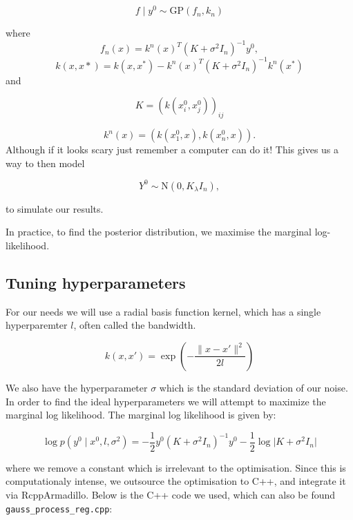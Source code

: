 \documentclass[
]{article}
\begin{document}
\[
f \mid y^0 \sim \text{GP}(f_n,k_n)
\]

where \[f_n(x) = k^n(x)^T(K + \sigma^2I_n)^{-1}y^0,\]
\[k(x,x*) = k(x, x^*) - k^n(x)^T (K + \sigma^2 I_n)^{-1} k^n(x^*)\] and

\[
K = (k(x_i^0,x_j^0))_{ij}
\]

\[
k^n(x) = (k(x_1^0,x),k(x_n^0,x)).
\] Although if it looks scary just remember a computer can do it! This
gives us a way to then model

\[Y^0 \sim \text{N}(0,K _ \lambda I_n),\]

to simulate our results.

In practice, to find the posterior distribution, we maximise the
marginal log-likelihood.

\hypertarget{tuning-hyperparameters}{%
\subsection{Tuning hyperparameters}\label{tuning-hyperparameters}}

For our needs we will use a radial basis function kernel, which has a
single hyperparemter \(l\), often called the bandwidth.

\[
k(x, x') = \exp\left(-\frac{\lVert x - x' \rVert^2}{2l}\right)
\]

We also have the hyperparameter \(\sigma\) which is the standard
deviation of our noise. In order to find the ideal hyperparameters we
will attempt to maximize the marginal log likelihood. The marginal log
likelihood is given by:

\[
\log p(y^0 \mid x^0, l,\sigma^2) = -\frac{1}{2} y^0 (K + \sigma^2 I_n)^{-1} y^0 - \frac{1}{2} \log \lvert K + \sigma^2 I_n \rvert 
\]

where we remove a constant which is irrelevant to the optimisation.
Since this is computationaly intense, we outsource the optimisation to
C++, and integrate it via RcppArmadillo. Below is the C++ code we used,
which can also be found \texttt{gauss\_process\_reg.cpp}:
\end{document}
